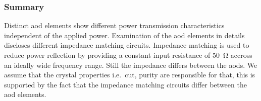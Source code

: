 \subsubsection{Summary}

Distinct \gls{aod} elements show different power transmission characteristics
independent of the applied power. Examination of the \gls{aod} elements in
details discloses different impedance matching circuits. Impedance matching
is used to reduce power reflection by providing a constant input resistance
of \SI{50}{\ohm} accross an ideally wide frequency range. Still the impedance
differs between the \gls{aod}s. We assume that the crystal properties
i.e.\ cut, purity are responsible for that, this is supported by the fact
that the impedance matching circuits differ between the \gls{aod} elements.
